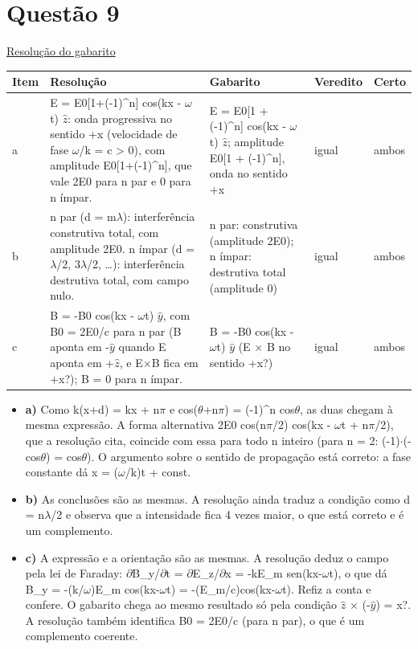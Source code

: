 \documentclass{article}%
\begin{document}
\section*{Questão 9}%
\href{https://poliedroresolve.sistemapoliedro.com.br/vestibulares/ita/2027/ita-2-fase-dia-3-22-10-2026-2-fase-dia-3/dissertativa-9-fisica-2-fase-dia-3-ita-2027}{Resolução do gabarito}\par\smallskip%
\begin{longtable}{@{}p{} p{} p{} p{} p{}@{}}\toprule Item & Resolução & Gabarito & Veredito & Certo \\ \midrule
a & E = E0{[}1+(-1)\^{}n{]} cos(kx - $\omega$t) $\hat z$: onda progressiva no sentido +x (velocidade de fase $\omega$/k = c > 0), com amplitude E0{[}1+(-1)\^{}n{]}, que vale 2E0 para n par e 0 para n ímpar. & E = E0{[}1 + (-1)\^{}n{]} cos(kx - $\omega$t) $\hat z$; amplitude E0{[}1 + (-1)\^{}n{]}, onda no sentido +x & igual & ambos \\
b & n par (d = m$\lambda$): interferência construtiva total, com amplitude 2E0. n ímpar (d = $\lambda$/2, 3$\lambda$/2, \ldots{}): interferência destrutiva total, com campo nulo. & n par: construtiva (amplitude 2E0); n ímpar: destrutiva total (amplitude 0) & igual & ambos \\
c & B = -B0 cos(kx - $\omega$t) $\hat y$, com B0 = 2E0/c para n par (B aponta em -$\hat y$ quando E aponta em +$\hat z$, e E$\times$B fica em +x?); B = 0 para n ímpar. & B = -B0 cos(kx - $\omega$t) $\hat y$ (E $\times$ B no sentido +x?) & igual & ambos \\
\bottomrule\end{longtable}%
\begin{itemize}%
\item%
\textbf{a)} Como k(x+d) = kx + n$\pi$ e cos($\theta$+n$\pi$) = (-1)\^{}n cos$\theta$, as duas chegam à mesma expressão. A forma alternativa 2E0 cos(n$\pi$/2) cos(kx - $\omega$t + n$\pi$/2), que a resolução cita, coincide com essa para todo n inteiro (para n = 2: (-1)$\cdot$(-cos$\theta$) = cos$\theta$). O argumento sobre o sentido de propagação está correto: a fase constante dá x = ($\omega$/k)t + const.%
\item%
\textbf{b)} As conclusões são as mesmas. A resolução ainda traduz a condição como d = n$\lambda$/2 e observa que a intensidade fica 4 vezes maior, o que está correto e é um complemento.%
\item%
\textbf{c)} A expressão e a orientação são as mesmas. A resolução deduz o campo pela lei de Faraday: $\partial$B\_y/$\partial$t = $\partial$E\_z/$\partial$x = -kE\_m sen(kx-$\omega$t), o que dá B\_y = -(k/$\omega$)E\_m cos(kx-$\omega$t) = -(E\_m/c)cos(kx-$\omega$t). Refiz a conta e confere. O gabarito chega ao mesmo resultado só pela condição $\hat z$ $\times$ (-$\hat y$) = x?. A resolução também identifica B0 = 2E0/c (para n par), o que é um complemento coerente.%
\end{itemize}%
\end{document}
